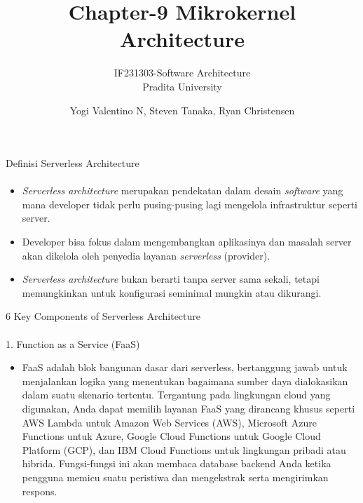 \documentclass[aspectratio=169, table]{beamer}
\title{Chapter-9 Mikrokernel Architecture}
\subtitle{IF231303-Software Architecture\\Pradita University}
\author{Yogi Valentino N, Steven Tanaka, Ryan Christensen}
\begin{document}
	
	

\begin{frame}[plain]
	\maketitle
\end{frame}



	
	
	
	\begin{frame}{Definisi Serverless Architecture}
		\framesubtitle{\hspace{1cm}}
		\begin{itemize}
			\item \emph{Serverless architecture} merupakan pendekatan dalam desain \emph{software} yang mana developer tidak perlu pusing-pusing lagi mengelola infrastruktur seperti server.
			\item Developer bisa fokus dalam mengembangkan aplikasinya dan masalah server akan dikelola oleh penyedia layanan \emph{serverless} (provider).
			\item \emph{Serverless architecture} bukan berarti tanpa server sama sekali, tetapi memungkinkan untuk konfigurasi seminimal mungkin atau dikurangi.
		\end{itemize}
	\end{frame}
	
	\begin{frame}{6 Key Components of Serverless Architecture}\\
			\framesubtitle{\hspace{1cm}}
		1. Function as a Service (FaaS)
		\begin{itemize}
			\item 
			FaaS adalah blok bangunan dasar dari serverless, bertanggung jawab untuk menjalankan logika yang menentukan bagaimana sumber daya dialokasikan dalam suatu skenario tertentu. 
			Tergantung pada lingkungan cloud yang digunakan, Anda dapat memilih layanan FaaS yang dirancang khusus seperti AWS Lambda untuk Amazon Web Services (AWS), Microsoft Azure Functions untuk Azure, Google Cloud Functions untuk Google Cloud Platform (GCP), dan IBM Cloud Functions untuk lingkungan pribadi atau hibrida. 
			Fungsi-fungsi ini akan membaca database backend Anda ketika pengguna memicu suatu peristiwa dan mengekstrak serta mengirimkan respons.
		\end{itemize}
	\end{frame}
	
\end{document}
